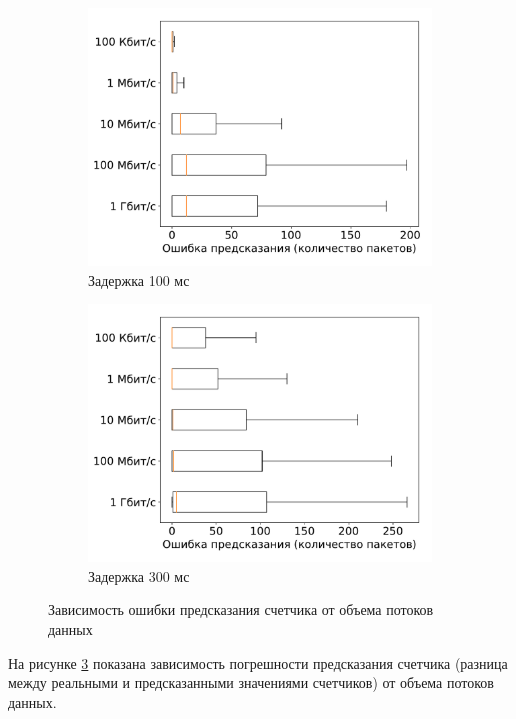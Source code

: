 \documentclass[../thesis.tex]{subfiles}
\begin{document}
\begin{figure}
\begin{subfigure}[b]{0.49\textwidth}
  \includegraphics[width=1.0\textwidth]{figures/experiments/packet_error_300.pdf}
  \caption{Задержка 100 мс} \label{fig:prediction_error_100}
\end{subfigure}
\begin{subfigure}[b]{0.49\textwidth}
  \centering
  \includegraphics[width=1.0\textwidth]{figures/experiments/packet_error.pdf}
  \caption{Задержка 300 мс} \label{fig:prediction_error_300}
\end{subfigure}
\caption{Зависимость ошибки предсказания счетчика от объема потоков данных} \label{fig:prediction_error}
\end{figure}

На рисунке \ref{fig:prediction_error} показана зависимость погрешности предсказания счетчика (разница между реальными и предсказанными значениями счетчиков) от объема потоков данных.
\end{document}
